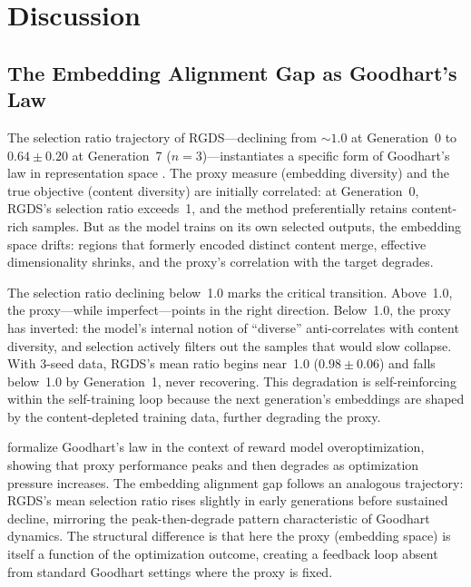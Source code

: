 \section{Discussion}
\label{sec:discussion}

\subsection{The Embedding Alignment Gap as Goodhart's Law}

The selection ratio trajectory of RGDS---declining from ${\sim}1.0$ at Generation~0 to $0.64 \pm 0.20$ at Generation~7 ($n{=}3$)---instantiates a specific form of Goodhart's law in representation space \citep{gao2023scaling, karwowski2024goodhart}. The proxy measure (embedding diversity) and the true objective (content diversity) are initially correlated: at Generation~0, RGDS's selection ratio exceeds~1, and the method preferentially retains content-rich samples. But as the model trains on its own selected outputs, the embedding space drifts: regions that formerly encoded distinct content merge, effective dimensionality shrinks, and the proxy's correlation with the target degrades.

The selection ratio declining below~1.0 marks the critical transition. Above~1.0, the proxy---while imperfect---points in the right direction. Below~1.0, the proxy has inverted: the model's internal notion of ``diverse'' anti-correlates with content diversity, and selection actively filters out the samples that would slow collapse. With 3-seed data, RGDS's mean ratio begins near~1.0 ($0.98 \pm 0.06$) and falls below~1.0 by Generation~1, never recovering. This degradation is self-reinforcing within the self-training loop because the next generation's embeddings are shaped by the content-depleted training data, further degrading the proxy.

\citet{karwowski2024goodhart} formalize Goodhart's law in the context of reward model overoptimization, showing that proxy performance peaks and then degrades as optimization pressure increases. The embedding alignment gap follows an analogous trajectory: RGDS's mean selection ratio rises slightly in early generations before sustained decline, mirroring the peak-then-degrade pattern characteristic of Goodhart dynamics. The structural difference is that here the proxy (embedding space) is itself a function of the optimization outcome, creating a feedback loop absent from standard Goodhart settings where the proxy is fixed.

